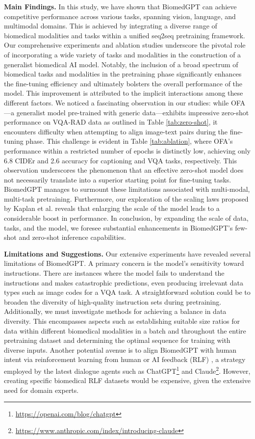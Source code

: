 \documentclass[10pt]{article} \usepackage[preprint]{tmlr}
\begin{document}
\noindent \textbf{Main Findings.} In this study, we have shown that BiomedGPT can achieve competitive performance across various tasks, spanning vision, language, and multimodal domains. This is achieved by integrating a diverse range of biomedical modalities and tasks within a unified seq2seq pretraining framework. Our comprehensive experiments and ablation studies underscore the pivotal role of incorporating a wide variety of tasks and modalities in the construction of a generalist biomedical AI model. Notably, the inclusion of a broad spectrum of biomedical tasks and modalities in the pretraining phase significantly enhances the fine-tuning efficiency and ultimately bolsters the overall performance of the model. This improvement is attributed to the implicit interactions among these different factors. We noticed a fascinating observation in our studies: while OFA---a generalist model pre-trained with generic data---exhibits impressive zero-shot performance on VQA-RAD data as outlined in Table \ref{tab:zero-shot}, it encounters difficulty when attempting to align image-text pairs during the fine-tuning phase. This challenge is evident in Table \ref{tab:ablation}, where OFA's performance within a restricted number of epochs is distinctly low, achieving only 6.8 CIDEr and 2.6 accuracy for captioning and VQA tasks, respectively. This observation underscores the phenomenon that an effective zero-shot model does not necessarily translate into a superior starting point for fine-tuning tasks. BiomedGPT manages to surmount these limitations associated with multi-modal, multi-task pretraining. Furthermore, our exploration of the scaling laws proposed by Kaplan et al. \citep{kaplan2020scaling} reveals that enlarging the scale of the model leads to a considerable boost in performance. In conclusion, by expanding the scale of data, tasks, and the model, we foresee substantial enhancements in BiomedGPT's few-shot and zero-shot inference capabilities.


\noindent \textbf{Limitations and Suggestions.} Our extensive experiments have revealed several limitations of BiomedGPT. A primary concern is the model's sensitivity toward instructions. There are instances where the model fails to understand the instructions and makes catastrophic predictions, even producing irrelevant data types such as image codes for a VQA task. A straightforward solution could be to broaden the diversity of high-quality instruction sets during pretraining. Additionally, we must investigate methods for achieving a balance in data diversity. This encompasses aspects such as establishing suitable size ratios for data within different biomedical modalities in a batch and throughout the entire pretraining dataset and determining the optimal sequence for training with diverse inputs. Another potential avenue is to align BiomedGPT with human intent via reinforcement learning from human or AI feedback (RLF) \citep{ouyang2022training, bai2022constitutional, zhou2023comprehensive}, a strategy employed by the latest dialogue agents such as ChatGPT\footnote{\url{https://openai.com/blog/chatgpt}} and Claude\footnote{\url{https://www.anthropic.com/index/introducing-claude}}. However, creating specific biomedical RLF datasets would be expensive, given the extensive need for domain experts.
\end{document}

